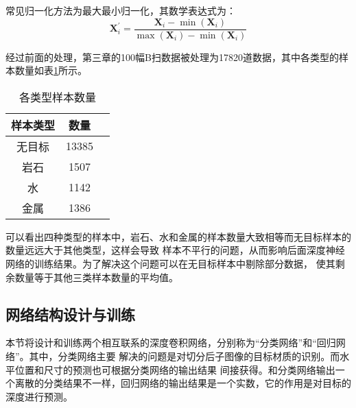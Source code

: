 常见归一化方法为最大最小归一化，其数学表达式为：
\begin{equation}
	\mathbf{X}_i^{\prime}=\frac{\mathbf{X}_i-\min (\mathbf{X}_i)}
	{\max (\mathbf{X}_i)-\min (\mathbf{X}_i)}
\end{equation}

经过前面的处理，第三章的100幅B扫数据被处理为17820道数据，其中各类型的样本数量如表\ref{table_sample_kind_unbalanced}所示。
\begin{table}[h]
	\caption{各类型样本数量} 
	\begin{tabular}{|c|c|c|} 
		\hline  
		样本类型 &  数量\\
		\hline 
		无目标 & 13385 \\  
		\hline  
		岩石 & 1507 \\  
		\hline  
		水 & 1142\\
		\hline
		金属 & 1386 \\
		\hline  
	\end{tabular}
	\label{table_sample_kind_unbalanced}
\end{table}

可以看出四种类型的样本中，岩石、水和金属的样本数量大致相等而无目标样本的数量远远大于其他类型，这样会导致
样本不平行的问题，从而影响后面深度神经网络的训练结果。为了解决这个问题可以在无目标样本中剔除部分数据，
使其剩余数量等于其他三类样本数量的平均值。

\subsection{网络结构设计与训练}
本节将设计和训练两个相互联系的深度卷积网络，分别称为“分类网络”和“回归网络”。其中，分类网络主要
解决的问题是对切分后子图像的目标材质的识别。而水平位置和尺寸的预测也可根据分类网络的输出结果
间接获得。和分类网络输出一个离散的分类结果不一样，回归网络的输出结果是一个实数，它的作用是对目标的
深度进行预测。
